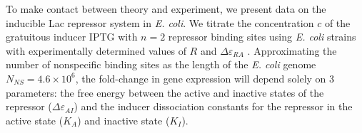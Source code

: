 To make contact between theory and experiment, we present data on the inducible
Lac repressor system in \textit{E. coli}. We titrate the concentration \(c\) of
the gratuitous inducer IPTG with $n=2$ repressor binding sites using \textit{E.
	coli} strains with experimentally determined values of $R$ and
$\Delta\varepsilon_{RA}$ \cite{Garcia2011}. Approximating the number of
nonspecific binding sites as the length of the \textit{E. coli} genome $N_{NS} =
4.6 \times 10^6$, the fold-change in gene expression will depend solely on 3
parameters: the free energy between the active and inactive states of the
repressor ($\Delta\varepsilon_{AI}$) and the inducer dissociation constants for
the repressor in the active state ($K_A$) and inactive state ($K_I$).

